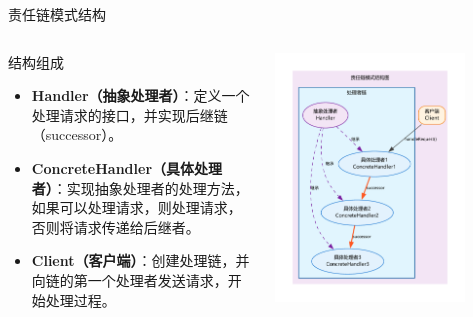 \documentclass[UTF8,aspectratio=169]{beamer}
\begin{document}
\begin{frame}{责任链模式结构}
    \begin{columns}
        \begin{column}{0.48\textwidth}
            \begin{ytublock}{结构组成}
                \begin{itemize}
                    \item \textbf{Handler（抽象处理者）}：定义一个处理请求的接口，并实现后继链（successor）。
                    \item \textbf{ConcreteHandler（具体处理者）}：实现抽象处理者的处理方法，如果可以处理请求，则处理请求，否则将请求传递给后继者。
                    \item \textbf{Client（客户端）}：创建处理链，并向链的第一个处理者发送请求，开始处理过程。
                \end{itemize}
            \end{ytublock}
        \end{column}
        \begin{column}{0.48\textwidth}
            \begin{center}
                \includegraphics[width=0.8\textwidth]{images/chain_of_responsibility_pattern.pdf}
            \end{center}
        \end{column}
    \end{columns}
\end{frame}
\end{document}
